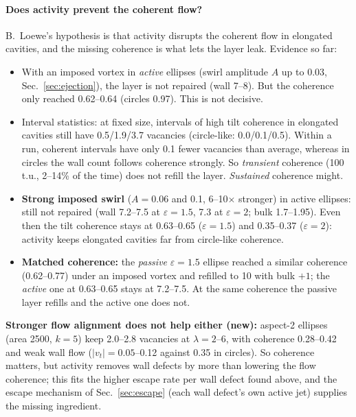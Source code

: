 \documentclass[11pt,a4paper]{article}
\begin{document}
\paragraph{Does activity prevent the coherent flow?} B.~Loewe's hypothesis is that activity disrupts the coherent flow in elongated cavities, and the missing
coherence is what lets the layer leak. Evidence so far:
\begin{itemize}
  \item With an imposed vortex in \emph{active} ellipses (swirl amplitude $A$ up to 0.03, Sec.~\ref{sec:ejection}), the layer is not repaired (wall 7--8). But the coherence only reached 0.62--0.64 (circles 0.97).
        This is not decisive.
  \item Interval statistics: at fixed size, intervals of high tilt coherence in elongated cavities still have 0.5/1.9/3.7 vacancies (circle-like: 0.0/0.1/0.5). Within a
        run, coherent intervals have only 0.1 fewer vacancies than average, whereas in circles the wall count follows coherence strongly. So \emph{transient} coherence
        (100\,t.u., 2--14\% of the time) does not refill the layer. \emph{Sustained} coherence might.
  \item \textbf{Strong imposed swirl} ($A=0.06$ and 0.1, 6--10$\times$ stronger) in active ellipses: still not repaired (wall 7.2--7.5 at $\varepsilon=1.5$, 7.3 at $\varepsilon=2$; bulk 1.7--1.95).
        Even then the tilt coherence stays at 0.63--0.65 ($\varepsilon=1.5$) and 0.35--0.37 ($\varepsilon=2$): activity keeps elongated cavities far from circle-like coherence.
  \item \textbf{Matched coherence:} the \emph{passive} $\varepsilon=1.5$ ellipse reached a similar coherence (0.62--0.77) under an imposed vortex and refilled to 10 with bulk $+1$; the
        \emph{active} one at 0.63--0.65 stays at 7.2--7.5. At the same coherence the passive layer refills and the active one does not.
\end{itemize}
\textbf{Stronger flow alignment does not help either (new):} aspect-2 ellipses (area 2500, $k=5$) keep 2.0--2.8 vacancies at $\lambda=2$--6, with coherence 0.28--0.42 and weak wall flow
($|v_t|=0.05$--0.12 against 0.35 in circles).
So coherence matters, but activity removes wall defects by more than lowering the flow coherence; this fits the higher escape rate per wall defect found above, and the
escape mechanism of Sec.~\ref{sec:escape} (each wall defect's own active jet) supplies the missing ingredient.


\end{document}
